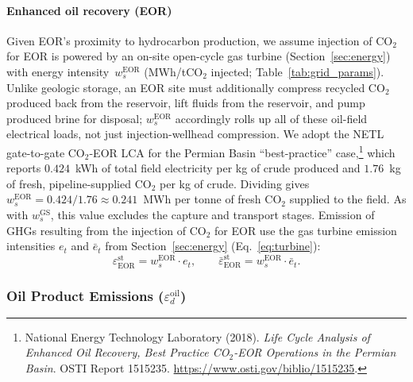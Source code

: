 \documentclass[11pt]{article}
\newcommand{\cotwo}{\ensuremath{\mathrm{CO_2}}}
\begin{document}
\paragraph{Enhanced oil recovery (EOR)}
Given EOR's proximity to hydrocarbon production, we assume injection of \cotwo{} for EOR is powered by an on-site open-cycle gas turbine (Section~\ref{sec:energy}) with energy intensity~$w_s^{\text{EOR}}$ (MWh/t\cotwo{} injected; Table~\ref{tab:grid_params}).
Unlike geologic storage, an EOR site must additionally compress recycled \cotwo{} produced back from the reservoir, lift fluids from the reservoir, and pump produced brine for disposal; $w_s^{\text{EOR}}$ accordingly rolls up all of these oil-field electrical loads, not just injection-wellhead compression. We adopt the NETL gate-to-gate CO$_2$-EOR LCA for the Permian Basin ``best-practice'' case,\footnote{National Energy Technology Laboratory (2018). \emph{Life Cycle Analysis of Enhanced Oil Recovery, Best Practice CO$_2$-EOR Operations in the Permian Basin}. OSTI Report 1515235. \url{https://www.osti.gov/biblio/1515235}.} which reports $0.424$~kWh of total field electricity per kg of crude produced and $1.76$~kg of fresh, pipeline-supplied \cotwo{} per kg of crude. Dividing gives $w_s^{\text{EOR}} = 0.424/1.76 \approx 0.241$~MWh per tonne of fresh \cotwo{} supplied to the field. As with $w_s^{\text{GS}}$, this value excludes the capture and transport stages.
Emission of GHGs resulting from the injection of \cotwo{} for EOR use the gas turbine emission intensities $e_t$ and $\bar{e}_t$ from Section~\ref{sec:energy} (Eq.~\ref{eq:turbine}):
%
\begin{equation}
  \varepsilon_{\text{EOR}}^{\text{st}} = w_s^{\text{EOR}} \cdot e_t, \qquad
  \bar{\varepsilon}_{\text{EOR}}^{\text{st}} = w_s^{\text{EOR}} \cdot \bar{e}_t.
  \label{eq:storage_eor}
\end{equation}

\subsubsection{Oil Product Emissions ($\varepsilon_d^{\text{oil}}$)}
\label{sec:product}
\end{document}
